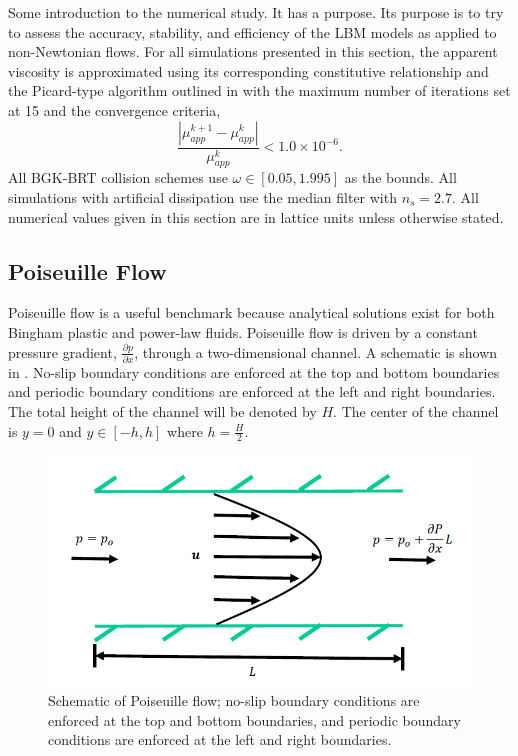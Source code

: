 \documentclass{article}
\begin{document}
Some introduction to the numerical study.
It has a purpose.
Its purpose is to try to assess the accuracy, stability, and efficiency of the LBM models as applied to non-Newtonian flows.
For all simulations presented in this section, the apparent viscosity is approximated using its corresponding constitutive relationship and the Picard-type algorithm outlined in  with the maximum number of iterations set at 15 and the convergence criteria,
\begin{equation} \label{eq:mu-app-conv}
\frac{\left|\mu_{app}^{k+1} - \mu_{app}^{k}\right|}{\mu_{app}^{k}} < 1.0 \times 10^{-6}.
\end{equation}
All BGK-BRT collision schemes use $\omega \in [0.05, 1.995]$ as the bounds.
All simulations with artificial dissipation use the median filter with $n_s = 2.7$.
All numerical values given in this section are in lattice units unless otherwise stated.

\newcommand{\pgrad}{\frac{\partial p}{\partial x}}

\subsection{Poiseuille Flow}

Poiseuille flow is a useful benchmark because analytical solutions exist for both Bingham plastic and power-law fluids.
Poiseuille flow is driven by a constant pressure gradient, $\pgrad$, through a two-dimensional channel.
A schematic is shown in .
No-slip boundary conditions are enforced at the top and bottom boundaries and periodic boundary conditions are enforced at the left and right boundaries.
The total height of the channel will be denoted by $H$.
The center of the channel is $y = 0$ and $y \in [-h, h]$ where $h = \frac{H}{2}$.

\begin{figure}
    \includegraphics[width=\linewidth]{figs/poise-schematic}
    \caption{Schematic of Poiseuille flow; no-slip boundary conditions are enforced at the top and bottom boundaries, and periodic boundary conditions are enforced at the left and right boundaries.}
    \label{fig:poise-schematic}
\end{figure}
\end{document}
